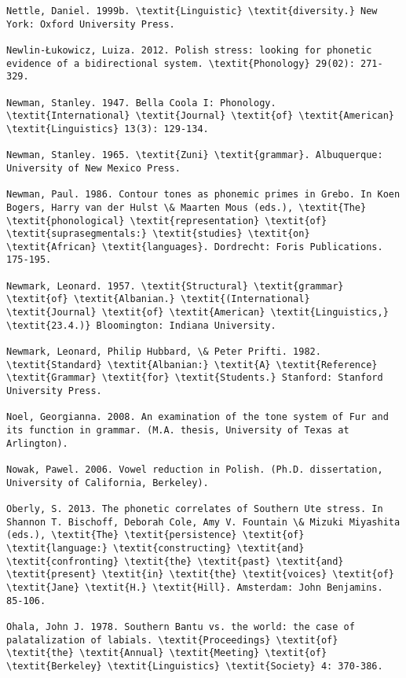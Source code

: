 \begin{verbatim}
Nettle, Daniel. 1999b. \textit{Linguistic} \textit{diversity.} New York: Oxford University Press.

Newlin-Łukowicz, Luiza. 2012. Polish stress: looking for phonetic evidence of a bidirectional system. \textit{Phonology} 29(02): 271-329.

Newman, Stanley. 1947. Bella Coola I: Phonology. \textit{International} \textit{Journal} \textit{of} \textit{American} \textit{Linguistics} 13(3): 129-134.

Newman, Stanley. 1965. \textit{Zuni} \textit{grammar}. Albuquerque: University of New Mexico Press.

Newman, Paul. 1986. Contour tones as phonemic primes in Grebo. In Koen Bogers, Harry van der Hulst \& Maarten Mous (eds.), \textit{The} \textit{phonological} \textit{representation} \textit{of} \textit{suprasegmentals:} \textit{studies} \textit{on} \textit{African} \textit{languages}. Dordrecht: Foris Publications. 175-195.

Newmark, Leonard. 1957. \textit{Structural} \textit{grammar} \textit{of} \textit{Albanian.} \textit{(International} \textit{Journal} \textit{of} \textit{American} \textit{Linguistics,} \textit{23.4.)} Bloomington: Indiana University.

Newmark, Leonard, Philip Hubbard, \& Peter Prifti. 1982. \textit{Standard} \textit{Albanian:} \textit{A} \textit{Reference} \textit{Grammar} \textit{for} \textit{Students.} Stanford: Stanford University Press.

Noel, Georgianna. 2008. An examination of the tone system of Fur and its function in grammar. (M.A. thesis, University of Texas at Arlington).

Nowak, Pawel. 2006. Vowel reduction in Polish. (Ph.D. dissertation, University of California, Berkeley).

Oberly, S. 2013. The phonetic correlates of Southern Ute stress. In Shannon T. Bischoff, Deborah Cole, Amy V. Fountain \& Mizuki Miyashita (eds.), \textit{The} \textit{persistence} \textit{of} \textit{language:} \textit{constructing} \textit{and} \textit{confronting} \textit{the} \textit{past} \textit{and} \textit{present} \textit{in} \textit{the} \textit{voices} \textit{of} \textit{Jane} \textit{H.} \textit{Hill}. Amsterdam: John Benjamins. 85-106.

Ohala, John J. 1978. Southern Bantu vs. the world: the case of palatalization of labials. \textit{Proceedings} \textit{of} \textit{the} \textit{Annual} \textit{Meeting} \textit{of} \textit{Berkeley} \textit{Linguistics} \textit{Society} 4: 370-386. 


\end{verbatim}

